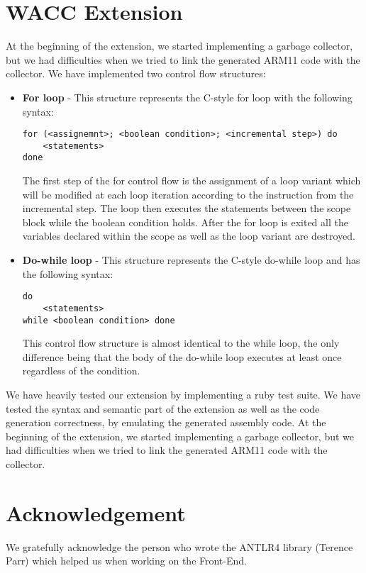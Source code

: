 \documentclass[11pt]{article}
\begin{document}
\section{WACC Extension}
\iffalse
BEYOND THE SPECIFICATION(4/4)
1. An evaluation of your extensions to your WACC compiler
2. Describe all of the language extensions, optimisations or other aspects that you have added to your compiler, including how these features can be accessed or viewed
3. BRIEFLY discuss what future extensions you would like to add to your WACC compiler if you had more time
\fi
At the beginning of the extension, we started implementing a garbage collector, but we had difficulties when we tried to link the generated ARM11 code with the collector.
We have implemented two control flow structures:
\begin{itemize}
\item \textbf{For loop} - This structure represents the C-style for loop with the following syntax:
\begin{lstlisting}
for (<assignemnt>; <boolean condition>; <incremental step>) do
	<statements>
done
\end{lstlisting}
The first step of the for control flow is the assignment of a loop variant which will be modified at each loop iteration according to the instruction from the incremental step. The loop then executes the statements between the scope block while the boolean condition holds. After the for loop is exited all the variables declared within the scope as well as the loop variant are destroyed.
\item \textbf{Do-while loop} - This structure represents the C-style do-while loop and has the following syntax:
\begin{lstlisting}
do
	<statements>
while <boolean condition> done
\end{lstlisting}
This control flow structure is almost identical to the while loop, the only difference being that the body of the do-while loop executes at least once regardless of the condition.
\end{itemize}

We have heavily tested our extension by implementing a ruby test suite. We have tested the syntax and semantic part of the extension as well as the code generation correctness, by emulating the generated assembly code. At the beginning of the extension, we started implementing a garbage collector, but we had difficulties when we tried to link the generated ARM11 code with the collector.

\section{Acknowledgement}
We gratefully acknowledge the person who wrote the ANTLR4 library (Terence Parr) which helped us when working on the Front-End.
\end{document}
